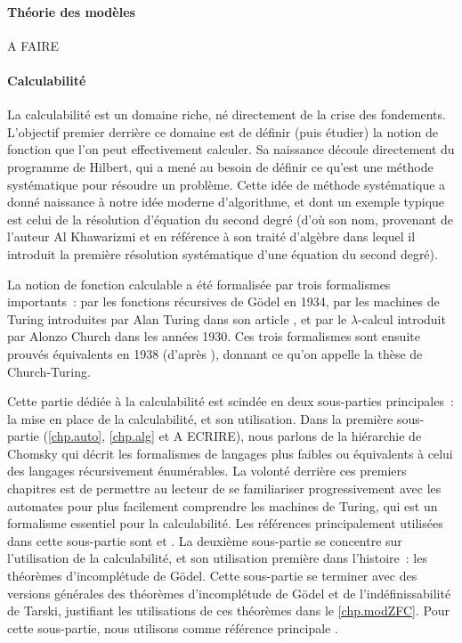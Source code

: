 \paragraph{Théorie des modèles}
A FAIRE

\paragraph{Calculabilité}
La calculabilité est un domaine riche, né directement de la crise des
fondements. L'objectif premier derrière ce domaine est de définir (puis étudier)
la notion de fonction que l'on peut effectivement calculer. Sa naissance découle
directement du programme de Hilbert, qui a mené au besoin de définir ce qu'est
une méthode systématique pour résoudre un problème. Cette idée de méthode
systématique a donné naissance à notre idée moderne d'algorithme, et dont un
exemple typique est celui de la résolution d'équation du second degré (d'où
son nom, provenant de l'auteur Al Khawarizmi et en référence à son traité
d'algèbre dans lequel il introduit la première résolution systématique d'une
équation du second degré).

La notion de fonction calculable a été formalisée par trois formalismes
importants~: par les fonctions récursives de Gödel en 1934, par les machines de
Turing introduites par Alan Turing dans son article \cite{turing1936a}, et
par le $\lambda$-calcul introduit par Alonzo Church dans les années 1930. Ces
trois formalismes sont ensuite prouvés équivalents en 1938 (d'après
\cite{4568032}), donnant ce qu'on appelle la thèse de Church-Turing.

Cette partie dédiée à la calculabilité est scindée en deux sous-parties
principales~: la mise en place de la calculabilité, et son utilisation. Dans
la première sous-partie (\cref{chp.auto}, \cref{chp.alg} et A ECRIRE), nous
parlons de la hiérarchie de Chomsky qui décrit les formalismes de langages
plus faibles ou équivalents à celui des langages récursivement énumérables.
La volonté derrière ces premiers chapitres est de permettre au lecteur de se
familiariser progressivement avec les automates pour plus facilement comprendre
les machines de Turing, qui est un formalisme essentiel pour la calculabilité.
Les références principalement utilisées dans cette sous-partie sont
\cite{carton2008langages} et \cite{wolper2001introduction}.
La deuxième sous-partie se concentre sur l'utilisation de la calculabilité, et
son utilisation première dans l'histoire~: les théorèmes d'incomplétude de
Gödel. Cette sous-partie se terminer avec des versions générales des théorèmes
d'incomplétude de Gödel et de l'indéfinissabilité de Tarski, justifiant
 les utilisations de ces théorèmes dans le
\cref{chp.modZFC}. Pour cette sous-partie, nous utilisons comme référence
principale \cite{MoninPatey2022}.

